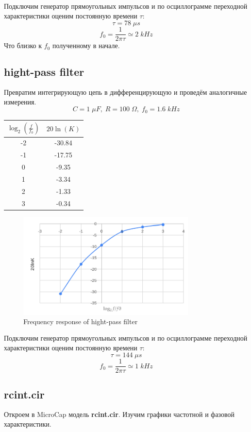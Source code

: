 \documentclass{article}
\begin{document}
Подключим генератор прямоугольных импульсов и по осциллограмме переходной характеристики
оценим постоянную времени \(\tau\):
\[\tau = 78\;\mu s\]
\[f_0 = \frac{1}{2\pi\tau}\simeq 2\; kHz\]
Что близко к \(f_0\) полученному в начале.
\subsection{hight-pass filter}
Превратим интегрирующую цепь в дифференцирующую и проведём аналогичные измерения.
\[C = 1\;\mu F,\; R = 100\;\Omega,\; f_0 = 1.6\;kHz\]

\begin{table}[H]
    \centering
    \begin{tabular}{|c|c|}
    \hline
    \(\log_2\left(\frac{f}{f_0}\right)\)&\(20\ln(K)\)\\\hline
    -2 & -30.84 \\\hline
    -1 & -17.75 \\\hline
    0  & -9.35  \\\hline
    1  & -3.34  \\\hline
    2  & -1.33  \\\hline
    3  & -0.34  \\\hline
    \end{tabular}
\end{table}

\begin{figure}[H]
    \centering
    \includegraphics[width=0.8\textwidth]{18.2.png}
    \caption{Frequency response of hight-pass filter }
\end{figure}

Подключим генератор прямоугольных импульсов и по осциллограмме переходной характеристики
оценим постоянную времени \(\tau\):
\[\tau = 144\;\mu s\]
\[f_0 = \frac{1}{2\pi\tau}\simeq 1\; kHz\]


\subsection{rcint.cir}
Откроем в MicroCap модель \textbf{rcint.cir}. Изучим графики частотной и фазовой характеристики.
\end{document}

